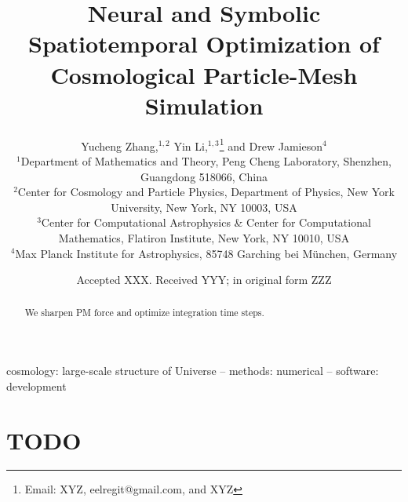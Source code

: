 \documentclass[usenatbib]{mnras}
\title[Spatiotemporally Optimized Simulation]
{Neural and Symbolic Spatiotemporal Optimization of Cosmological
Particle-Mesh Simulation}
\author[Zhang, Li, Jamieson, et al.]{
%
Yucheng Zhang,$^{1, 2}$
%
Yin Li,$^{1, 3}$\thanks{Email: XYZ, eelregit@gmail.com, and XYZ}
%
and Drew Jamieson$^{4}$
%
\\$^1$Department of Mathematics and Theory, Peng Cheng Laboratory,
Shenzhen, Guangdong 518066, China
%
\\$^2$Center for Cosmology and Particle Physics, Department of Physics,
New York University, New York, NY 10003, USA
%
\\$^3$Center for Computational Astrophysics \& Center for Computational
Mathematics, Flatiron Institute, New York, NY 10010, USA
%
\\$^4$Max Planck Institute for Astrophysics, 85748 Garching bei
M\"unchen, Germany
}
\date{Accepted XXX. Received YYY; in original form ZZZ}
\begin{document}
\label{firstpage}
\pagerange{\pageref{firstpage}--\pageref{lastpage}}
\maketitle



\begin{abstract}
We sharpen PM force and optimize integration time steps.
\end{abstract}

\begin{keywords}
cosmology: large-scale structure of Universe
-- methods: numerical
-- software: development
\end{keywords}



\section*{TODO}
\end{document}
